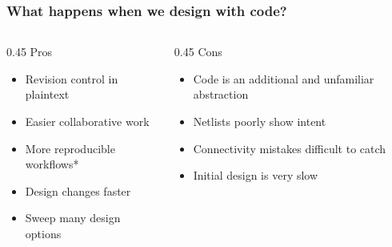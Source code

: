 \begin{frame}
  \frametitle{What happens when we design with code?}
  \vfill
  \begin{center}
  \begin{minipage}{0.88\textwidth}
  \begin{columns}[T,totalwidth=\textwidth]
    \begin{column}{0.45\textwidth}
      \textcolor{NordGreen!55!black}{\large Pros}
      \vspace{0.5em}
      \begin{itemize}
        \item[\textcolor{NordGreen!65!black}{\Large $\checkmark$}] Revision control in plaintext
        \item[\textcolor{NordGreen!65!black}{\Large $\checkmark$}] Easier collaborative work
        \item[\textcolor{NordGreen!65!black}{\Large $\checkmark$}] More reproducible workflows*
        \item[\textcolor{NordGreen!65!black}{\Large $\checkmark$}] Design changes faster
        \item[\textcolor{NordGreen!65!black}{\Large $\checkmark$}] Sweep many design options
      \end{itemize}
    \end{column}
    \hfill
    \begin{column}{0.45\textwidth}
      \textcolor{NordRed!85!black}{\large Cons}
      \vspace{0.5em}
      \begin{itemize}
        \item[\textcolor{NordRed!85!black}{\Large $\checkmark$}] Code is an additional and unfamiliar abstraction
        \item[\textcolor{NordRed!85!black}{\Large $\checkmark$}] Netlists poorly show intent
        \item[\textcolor{NordRed!85!black}{\Large $\checkmark$}] Connectivity mistakes difficult to catch
        \item[\textcolor{NordRed!85!black}{\Large $\checkmark$}] Initial design is very slow
      \end{itemize}
    \end{column}
  \end{columns}
  \end{minipage}
  \end{center}
  \vfill
\end{frame}
